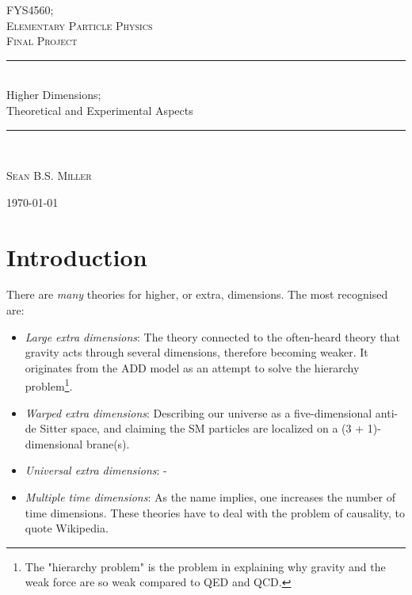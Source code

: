 \documentclass[11pt,a4paper]{article}
\newcommand{\HRule}{\rule{\linewidth}{0.5mm}}
\begin{document}
\begin{titlepage}
\begin{center}
\medskip
\textsc{\LARGE FYS4560;}\\[0.3cm]
\textsc{\Large Elementary Particle Physics}\\[1.5cm]

\textsc{\Large Final Project}\\[0.5cm]

\HRule \\[1.0cm]
\textmd{ \huge Higher Dimensions; \\ \LARGE Theoretical and Experimental Aspects \\[0.4cm] }
\HRule \huge \\[1.5cm]

\begin{minipage}{0.4\textwidth}
\begin{center}
\large\textsc{Sean B.S. Miller}\\

\end{center}
\end{minipage}

\vfill

{\large \today}

\end{center}
\end{titlepage}

\newpage

\fancyhead[C]{\textsc{\today}}
\fancyfoot[C]{\thepage}

\section{Introduction}
There are \emph{many} theories for higher, or extra, dimensions. The most recognised are:
\begin{itemize}
	\item \emph{Large extra dimensions}: The theory connected to the often-heard theory that gravity acts through several dimensions, therefore becoming weaker. It originates from the ADD model as an attempt to solve the hierarchy problem\footnote{The "hierarchy problem" is the problem in explaining why gravity and the weak force are so weak compared to QED and QCD.}.
	\item \emph{Warped extra dimensions}: Describing our universe as a five-dimensional anti-de Sitter space, and claiming the SM particles are localized on a (3 + 1)-dimensional brane(s).
	\item \emph{Universal extra dimensions}: -
	\item \emph{Multiple time dimensions}: As the name implies, one increases the number of time dimensions. These theories have to deal with the problem of causality, to quote Wikipedia.
\end{itemize}
\end{document}
